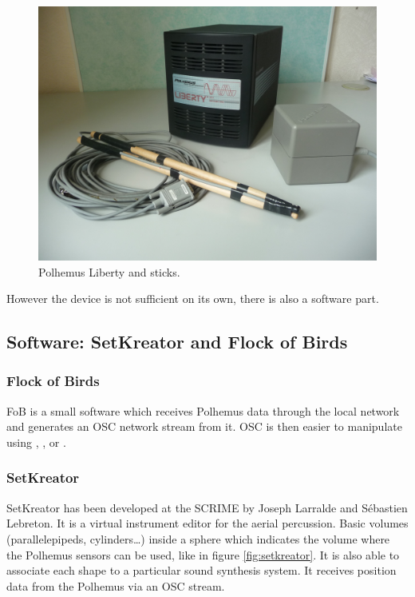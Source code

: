 \begin{figure}[h!]
\centering\includegraphics[scale=0.11]{image/percu.jpg}
\caption{Polhemus Liberty and sticks.}
\label{fig:percu}
\end{figure}

However the device is not sufficient on its own, there is also a software part.

\newpage
\subsection{Software: SetKreator and Flock of Birds}
\subsubsection{Flock of Birds}
\ac{FoB} is a small software which receives Polhemus data through the  local network and generates an \ac{OSC} network stream from it.
\ac{OSC} is then easier to manipulate using , , or .

\subsubsection{SetKreator}
SetKreator has been developed at the \ac{SCRIME} by Joseph Larralde and Sébastien Lebreton. It is a virtual instrument editor for the aerial percussion. Basic volumes (parallelepipeds, cylinders\dots ) inside a sphere which indicates the volume where the Polhemus sensors can be used, like in figure \ref{fig:setkreator}. It is also able to associate each shape to a particular sound synthesis system. It receives position data from the Polhemus via an \ac{OSC} stream.

